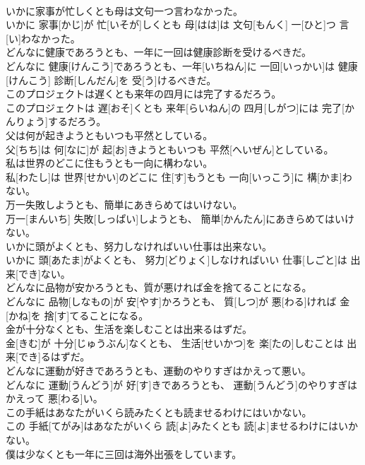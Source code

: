 \documentclass[8pt]{extreport}
\begin{document}
\begin{CJK}{UTF8}{min}
\\	いかに家事が忙しくとも母は文句一つ言わなかった。	
\\	いかに 家事[かじ]が 忙[いそが]しくとも 母[はは]は 文句[もんく] 一[ひと]つ 言[い]わなかった。
\\	どんなに健康であろうとも、一年に一回は健康診断を受けるべきだ。	
\\	どんなに 健康[けんこう]であろうとも、一年[いちねん]に 一回[いっかい]は 健康[けんこう] 診断[しんだん]を 受[う]けるべきだ。
\\	このプロジェクトは遅くとも来年の四月には完了するだろう。	
\\	このプロジェクトは 遅[おそ]くとも 来年[らいねん]の 四月[しがつ]には 完了[かんりょう]するだろう。
\\	父は何が起きようともいつも平然としている。	
\\	父[ちち]は 何[なに]が 起[お]きようともいつも 平然[へいぜん]としている。
\\	私は世界のどこに住もうとも一向に構わない。	
\\	私[わたし]は 世界[せかい]のどこに 住[す]もうとも 一向[いっこう]に 構[かま]わない。
\\	万一失敗しようとも、簡単にあきらめてはいけない。	
\\	万一[まんいち] 失敗[しっぱい]しようとも、 簡単[かんたん]にあきらめてはいけない。
\\	いかに頭がよくとも、努力しなければいい仕事は出来ない。	
\\	いかに 頭[あたま]がよくとも、 努力[どりょく]しなければいい 仕事[しごと]は 出来[でき]ない。
\\	どんなに品物が安かろうとも、質が悪ければ金を捨てることになる。	
\\	どんなに 品物[しなもの]が 安[やす]かろうとも、 質[しつ]が 悪[わる]ければ 金[かね]を 捨[す]てることになる。
\\	金が十分なくとも、生活を楽しむことは出来るはずだ。	
\\	金[きむ]が 十分[じゅうぶん]なくとも、 生活[せいかつ]を 楽[たの]しむことは 出来[でき]るはずだ。
\\	どんなに運動が好きであろうとも、運動のやりすぎはかえって悪い。	
\\	どんなに 運動[うんどう]が 好[す]きであろうとも、 運動[うんどう]のやりすぎはかえって 悪[わる]い。
\\	この手紙はあなたがいくら読みたくとも読ませるわけにはいかない。	
\\	この 手紙[てがみ]はあなたがいくら 読[よ]みたくとも 読[よ]ませるわけにはいかない。
\\	僕は少なくとも一年に三回は海外出張をしています。	

\end{CJK}
\end{document}
